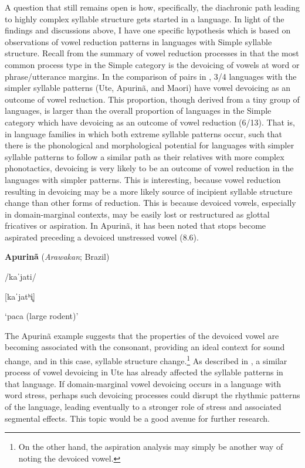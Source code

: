   A question that still remains open is how, specifically, the diachronic path leading to highly complex syllable structure gets started in a language. In light of the findings and discussions above, I have one specific hypothesis which is based on observations of vowel reduction patterns in languages with Simple syllable structure. Recall from the summary of vowel reduction processes in  that the most common process type in the Simple category is the devoicing of vowels at word or phrase/utterance margins. In the comparison of pairs in , 3/4 languages with the simpler syllable patterns (Ute, Apurinã, and Maori) have vowel devoicing as an outcome of vowel reduction. This proportion, though derived from a tiny group of languages, is larger than the overall proportion of languages in the Simple category which have devoicing as an outcome of vowel reduction (6/13). That is, in language families in which both extreme syllable patterns occur, such that there is the phonological and morphological potential for languages with simpler syllable patterns to follow a similar path as their relatives with more complex phonotactics, devoicing is very likely to be an outcome of vowel reduction in the languages with simpler patterns. This is interesting, because vowel reduction resulting in devoicing may be a more likely source of incipient syllable structure change than other forms of reduction. This is because devoiced vowels, especially in domain-marginal contexts, may be easily lost or restructured as glottal fricatives or aspiration. In Apurinã, it has been noted that stops become aspirated preceding a devoiced unstressed vowel (8.6).

\ea\label{ex:(8.6)}
  \textbf{Apurinã} (\textit{Arawakan}; Brazil)

/kaˈjati/

[kaˈjatʰi̥]

‘paca (large rodent)’

\citep[60-1]{Facundes2000} 
\z

  The Apurinã example suggests that the properties of the devoiced vowel are becoming associated with the consonant, providing an ideal context for sound change, and in this case, syllable structure change.\footnote{ \textrm{On the other hand, the aspiration analysis may simply be another way of noting the devoiced vowel.}} As described in , a similar process of vowel devoicing in Ute has already affected the syllable patterns in that language. If domain-marginal vowel devoicing occurs in a language with word stress, perhaps such devoicing processes could disrupt the rhythmic patterns of the language, leading eventually to a stronger role of stress and associated segmental effects. This topic would be a good avenue for further research.

